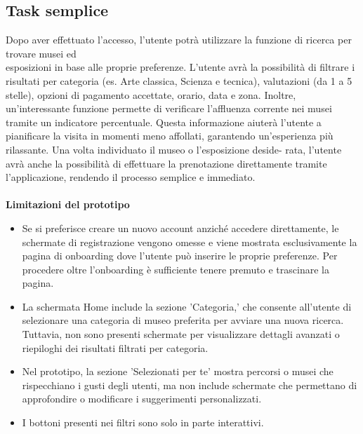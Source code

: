 \documentclass{article}
\begin{document}
\subsection{Task semplice}
Dopo aver effettuato l'accesso, l'utente potrà utilizzare la funzione di ricerca per trovare musei ed \\ esposizioni in base alle proprie preferenze. L'utente avrà la possibilità di filtrare i risultati per categoria (es. Arte classica, Scienza e tecnica), valutazioni (da 1 a 5 stelle), opzioni di pagamento accettate, orario, data e zona. Inoltre, un'interessante funzione permette di verificare l'affluenza corrente nei musei tramite un indicatore percentuale. Questa informazione aiuterà l'utente a pianificare la visita in momenti meno affollati, garantendo un'esperienza più rilassante. Una volta individuato il museo o l'esposizione deside- rata, l'utente avrà anche la possibilità di effettuare la prenotazione direttamente tramite l'applicazione, rendendo il processo semplice e immediato.\\
\\
\textbf{Limitazioni del prototipo}
\begin{itemize}
\item Se si preferisce creare un nuovo account anziché accedere direttamente, le schermate di registrazione vengono omesse e viene mostrata esclusivamente la pagina di onboarding dove l'utente può inserire le proprie preferenze. Per procedere oltre l'onboarding è sufficiente tenere premuto e trascinare la pagina.
\item La schermata Home include la sezione 'Categoria,' che consente all’utente di selezionare una categoria di museo preferita per avviare una nuova ricerca. Tuttavia, non sono presenti schermate per visualizzare dettagli avanzati o riepiloghi dei risultati filtrati per categoria.
\item Nel prototipo, la sezione 'Selezionati per te' mostra percorsi o musei che rispecchiano i gusti degli utenti, ma non include schermate che permettano di approfondire o modificare i suggerimenti personalizzati.
\item I bottoni presenti nei filtri sono solo in parte interattivi.
\end{itemize}
\end{document}
